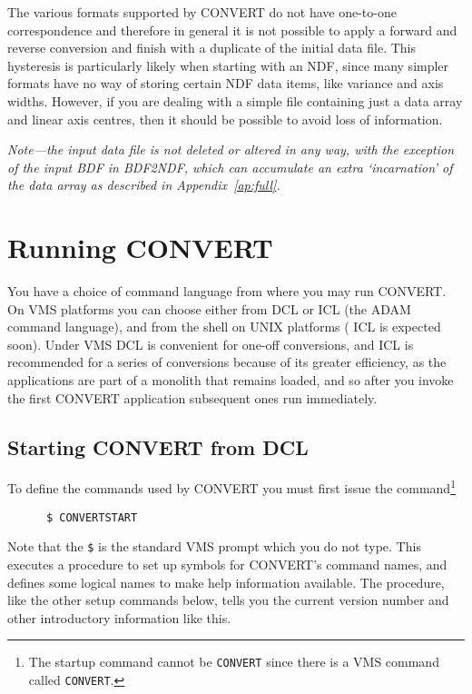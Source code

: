 The various formats supported by {\footnotesize CONVERT} do not have
one-to-one correspondence and therefore in general it is not possible to
apply a forward and reverse conversion and finish with a duplicate of
the initial data file.  This hysteresis is particularly likely when
starting with an NDF, since many simpler formats have no way of storing
certain NDF data items, like variance and axis widths.  However, if you
are dealing with a simple file containing just a data array and linear
axis centres, then it should be possible to avoid loss of information. 

{\sl Note---the input data file is not deleted or altered in any way, 
with the exception of the input BDF in BDF2NDF, which can accumulate an 
extra `incarnation' of the data array as described in
Appendix~\ref{ap:full}.}


\section{Running CONVERT}

You have a choice of command language from where you may run
{\footnotesize CONVERT}.  On VMS platforms you can choose either from
{\footnotesize DCL} or {\footnotesize ICL} (the {\footnotesize ADAM}
command language), and from the shell on UNIX platforms ({\footnotesize
ICL} is expected soon).  Under VMS {\footnotesize DCL} is 
convenient for one-off conversions, and {\footnotesize ICL} is
recommended for a series of conversions because of its greater
efficiency, as the applications are part of a monolith that remains
loaded, and so after you invoke the first {\footnotesize CONVERT}
application subsequent ones run immediately. 

\subsection{Starting CONVERT from DCL}

To define the commands used by {\footnotesize CONVERT} you must first
issue the command\footnote{The startup command cannot be {\tt CONVERT}
since there is a VMS command called {\tt CONVERT}.} 

\small
\begin{verbatim}
      $ CONVERTSTART
\end{verbatim}
\normalsize 
Note that the {\tt \$} is the standard VMS prompt which you do not type.
This executes a procedure to set up symbols for {\footnotesize
CONVERT}'s command names, and defines some logical names to make help
information available.  The procedure, like the other setup commands
below, tells you the current version number and other introductory
information like this. 

